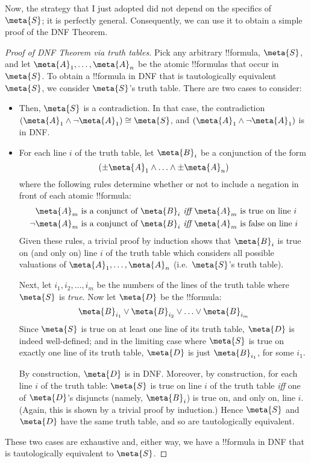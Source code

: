 \documentclass[../../../include/open-logic-section]{subfiles}
\begin{document}
Now, the strategy that I just adopted did not depend on the specifics of $\meta{S}$; it is perfectly general. Consequently, we can use it to obtain a simple proof of the DNF Theorem.

\begin{proof}[Proof of DNF Theorem via truth tables]
Pick any arbitrary !!{formula}, $\meta{S}$, and let $\meta{A}_1, \ldots, \meta{A}_n$ be the atomic !!{formula}s that occur in $\meta{S}$. To obtain a !!{formula} in DNF that is tautologically equivalent $\meta{S}$, we consider $\meta{S}$'s truth table. There are two cases to consider:
	\begin{itemize}
		\item[\emph{Case 1: $\meta{S}$ is false on every line of its truth table.}] Then, $\meta{S}$ is a contradiction. In that case, the contradiction $(\meta{A}_1 \land \lnot \meta{A}_1) \cong \meta{S}$, and $(\meta{A}_1 \land \lnot \meta{A}_1)$ is in DNF. 
	
		\item[\emph{Case 2:  $\meta{S}$ is true on at least one line of its truth table.}]
		For each line $i$ of the truth table, let $\meta{B}_i$ be a conjunction of the form 
		$$(\pm\meta{A}_1 \land \ldots \land \pm\meta{A}_n)$$
		where the following rules determine whether or not to include a negation in front of each atomic !!{formula}:
			\begin{align*}
				\meta{A}_m\text{ is a conjunct of }\meta{B}_i&\emph{ iff }\meta{A}_m\text{ is true on line }i\\
				\lnot\meta{A}_m\text{ is a conjunct of }\meta{B}_i&\emph{ iff }\meta{A}_m\text{ is false on line }i
			\end{align*}
		Given these rules, a trivial proof by induction shows that $\meta{B}_i$ is true on (and only on) line $i$ of the truth table which considers all possible valuations of $\meta{A}_1, \ldots, \meta{A}_n$ (i.e.\ $\meta{S}$'s truth table). 
		
		Next, let $i_1, i_2, \ldots, i_m$ be the numbers of the lines of the truth table where $\meta{S}$ is \emph{true}. Now let $\meta{D}$ be the !!{formula}:
		$$\meta{B}_{i_1} \lor \meta{B}_{i_2} \lor \ldots \lor \meta{B}_{i_m}$$
		Since $\meta{S}$ is true on at least one line of its truth table, $\meta{D}$ is indeed well-defined; and in the limiting case where $\meta{S}$ is true on exactly one line of its truth table, $\meta{D}$ is just $\meta{B}_{i_1}$, for some $i_1$.
		
		By construction, $\meta{D}$ is in DNF. Moreover, by construction, for each line $i$ of the truth table: $\meta{S}$ is true on line $i$ of the truth table \emph{iff} one of $\meta{D}$'s disjuncts (namely, $\meta{B}_i$) is true on, and only on, line $i$. (Again, this is shown by a trivial proof by induction.) Hence $\meta{S}$ and $\meta{D}$ have the same truth table, and so are tautologically equivalent.
	\end{itemize}
	These two cases are exhaustive and, either way, we have a !!{formula} in DNF that is tautologically equivalent to $\meta{S}$.
\end{proof}\noindent
\end{document}
